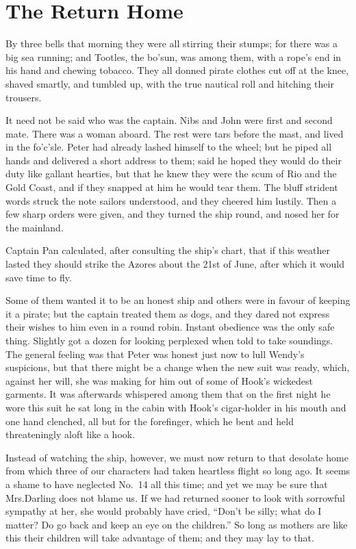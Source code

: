 
\chapter{The Return Home}

By three bells that morning they were all stirring their stumps;
for there was a big sea running;
and Tootles, the bo’sun, was among them,
with a rope’s end in his hand and chewing tobacco.
They all donned pirate clothes cut off at the knee,
shaved smartly, and tumbled up,
with the true nautical roll and hitching their trousers.

It need not be said who was the captain.
Nibs and John were first and second mate.
There was a woman aboard.
The rest were tars before the mast, and lived in the fo’c’sle.
Peter had already lashed himself to the wheel;
but he piped all hands and delivered a short address to them;
said he hoped they would do their duty like gallant hearties,
but that he knew they were the scum of Rio and the Gold Coast,
and if they snapped at him he would tear them.
The bluff strident words struck the note sailors understood,
and they cheered him lustily.
Then a few sharp orders were given,
and they turned the ship round, and nosed her for the mainland.

Captain Pan calculated, after consulting the ship’s chart,
that if this weather lasted they should strike the Azores about the 21st of June,
after which it would save time to fly.

Some of them wanted it to be an honest ship and others were in favour of keeping it a pirate;
but the captain treated them as dogs,
and they dared not express their wishes to him even in a round robin.
Instant obedience was the only safe thing.
Slightly got a dozen for looking perplexed when told to take soundings.
The general feeling was that Peter was honest just now to lull Wendy’s suspicions,
but that there might be a change when the new suit was ready,
which, against her will, she was making for him out of some of Hook’s wickedest garments.
It was afterwards whispered among them that on the first night he wore this suit
he sat long in the cabin with Hook’s cigar-holder in his mouth and one hand clenched,
all but for the forefinger, which he bent and held threateningly aloft like a hook.

Instead of watching the ship, however,
we must now return to that desolate home from which three of our characters had taken heartless flight so long ago.
It seems a shame to have neglected No.~14 all this time;
and yet we may be sure that Mrs.\@ Darling does not blame us.
If we had returned sooner to look with sorrowful sympathy at her, she would probably have cried,
“Don’t be silly;
what do I matter?
Do go back and keep an eye on the children.”
So long as mothers are like this their children will take advantage of them;
and they may lay to that.


